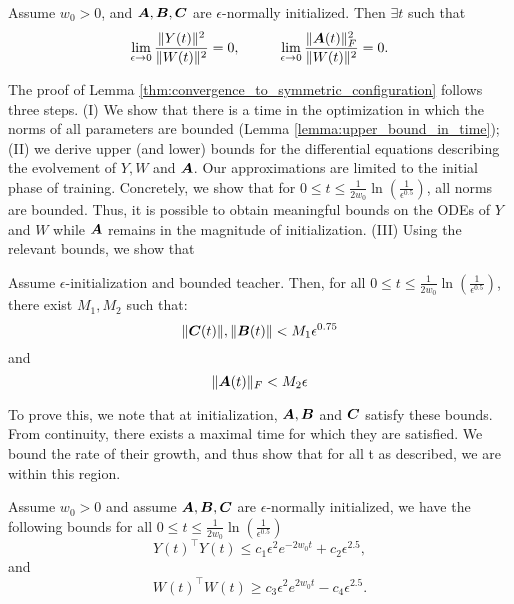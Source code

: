 \begin{lemma}\label{thm:convergence_to_symmetric_configuration}
Assume $w_0>0$, and ${\bm{A}},{\bm{B}},{\bm{C}}$ are $\epsilon$-normally initialized. Then $\exists t$ such that 
\begin{equation}
 \lim_{\epsilon\rightarrow 0}\frac{\|Y(t)\|^2}{\|W(t)\|^2}=0   ,\hspace{1cm} \lim_{\epsilon\rightarrow 0}\frac{\|{\bm{A}}(t)\|_F^2}{\|W(t)\|^2}=0.
\end{equation}
\end{lemma}


The proof of Lemma \ref{thm:convergence_to_symmetric_configuration} follows three steps. (I) We show that there is a time in the optimization in which the norms of all parameters are bounded (Lemma \ref{lemma:upper_bound_in_time}); (II) we derive upper (and lower) bounds for the differential equations describing the evolvement of $Y,W$ and ${\bm{A}}$. Our approximations are limited to the initial phase of training. Concretely, we show that for $0\le t\le \frac{1}{2w_0}\ln{\left(\frac{1}{\epsilon^{0.5}} \right)}$, all norms are bounded. Thus, it is possible to obtain meaningful bounds on the ODEs of $Y$ and $W$ while ${\bm{A}}$ remains in the magnitude of initialization. (III) Using the relevant bounds, we show that 


\begin{lemma}\label{lemma:upper_bound_in_time}
Assume $\epsilon$-initialization and bounded teacher. Then, for all $0\leq t \leq \frac{1}{2w_0}\ln{\left( \frac{1}{\epsilon^{0.5}}\right)}$, there exist $M_1, M_2$ such that:
\begin{equation}
    \|{\bm{C}}(t)\|, \|{\bm{B}}(t)\| < M_1\epsilon^{0.75}
\end{equation}
and
\begin{equation}
    \|{\bm{A}}(t)\|_F < M_2 \epsilon
\end{equation}
\end{lemma}

To prove this, we note that at initialization, ${\bm{A}},{\bm{B}}$ and ${\bm{C}}$ satisfy these bounds. From continuity, there exists a maximal time for which they are satisfied. We bound the rate of their growth, and thus show that for all t as described, we are within this region.

\begin{lemma}\label{lemma:Y_and_W_ode}
Assume $w_0>0$ and assume ${\bm{A}},{\bm{B}},{\bm{C}}$ are $\epsilon$-normally initialized, we have the following bounds for all $0\le t\le \frac{1}{2w_0}\ln{\left( \frac{1}{\epsilon^{0.5}}\right)}$
\begin{equation}\label{eq:z_ode}
    Y(t)^\top Y(t)  \le c_1\epsilon^2e^{-2w_0 t} + c_2 \epsilon^{2.5},
\end{equation}
and
\begin{equation}\label{eq:x_ode}
    W(t)^\top W(t)  \ge c_3\epsilon^2e^{2w_0 t} - c_4 \epsilon^{2.5}.
\end{equation}
\end{lemma}


